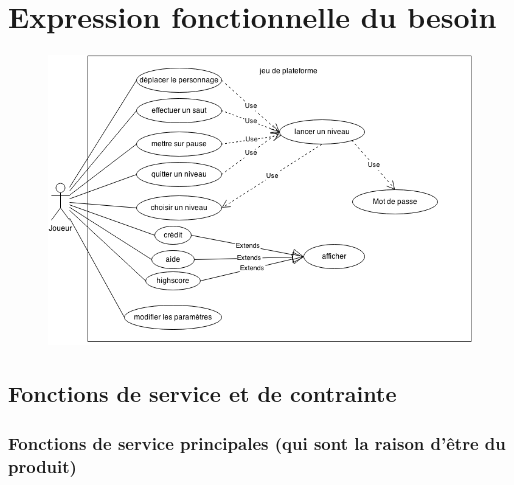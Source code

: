 \documentclass[11pt]{report}
\begin{document}
	\chapter{Expression fonctionnelle du besoin}
	\thispagestyle{fancy}

		\begin{figure}[h]
		     \begin{center}
			 	\includegraphics[scale=0.6]{use-case.png}
		     \end{center}
		\end{figure}
		
		\section{Fonctions de service et de contrainte}
		
			\subsection{Fonctions de service principales (qui sont la raison d’être du produit)}
			
\end{document}
